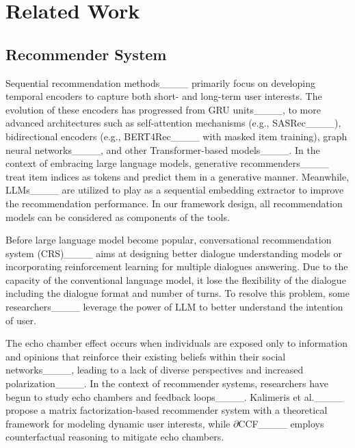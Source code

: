\section{Related Work}
\subsection{Recommender System}

Sequential recommendation methods____ primarily focus on developing temporal encoders to capture both short- and long-term user interests. The evolution of these encoders has progressed from GRU units____, to more advanced architectures such as self-attention mechanisms (e.g., SASRec____), bidirectional encoders (e.g., BERT4Rec____ with masked item training), graph neural networks____, and other Transformer-based models____.
In the context of embracing large language models, generative recommenders____ treat item indices as tokens and predict them in a generative manner. Meanwhile, LLMs____ are utilized to play as a sequential embedding extractor to improve the recommendation performance. In our framework design, all recommendation models can be considered as components of the tools.

Before large language model become popular, conversational recommendation system (CRS)____ aims at designing better dialogue understanding models or incorporating reinforcement learning for multiple dialogues answering. Due to the capacity of the conventional language model, it lose the flexibility of the dialogue including the dialogue format and number of turns. To resolve this problem, some researchers____ leverage the power of LLM to better understand the intention of user. 


The echo chamber effect occurs when individuals are exposed only to information and opinions that reinforce their existing beliefs within their social networks____, leading to a lack of diverse perspectives and increased polarization____. In the context of recommender systems, researchers have begun to study echo chambers and feedback loops____. Kalimeris et al.____ propose a matrix factorization-based recommender system with a theoretical framework for modeling dynamic user interests, while $\partial$CCF____ employs counterfactual reasoning to mitigate echo chambers.

